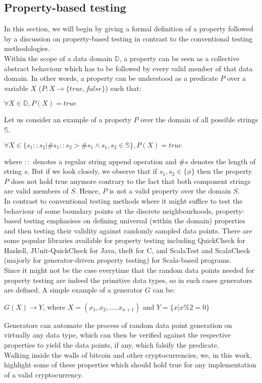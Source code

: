 
\newcommand{\avector}[2]{(#1_1,#1_2,\ldots,#1_{#2})}
\newcommand{\aDEFvector}[2][a]{(#1_1,#1_2,\ldots,#1_{#2})}

\subsection{Property-based testing}
In this section, we will begin by giving a formal definition of a property followed by a discussion on property-based testing in contrast to the conventional testing methodologies.\\
Within the scope of a data domain $\mathbb{D}$, a property can be seen as a collective abstract behaviour which has to be followed by every valid member of that data domain. In other words, a property can be understood as a predicate $P$ over a variable $X$ ($P:X \rightarrow \{true, false\}$) such that: 
\begin{center}
$\forall X \in \mathbb{D}, P(X) = true$
\end{center}
Let us consider an example of a property $P$ over the domain of all possible strings $\mathbb{S}$.
\begin{center}
$\forall X \in \{s_1::s_2 | \#s_1::s_2 >  \#s_1 \wedge s_1, s_2 \in \mathbb{S}\}, P(X) = true$
\end{center}
where $::$ denotes a regular string append operation and $\#s$ denotes the length of string $s$. But if we look closely, we observe that if $s_1, s_2 \in \{\phi\}$ then the property $P$ does not hold true anymore contrary to the fact that both component strings are valid members of $S$. Hence, $P$ is not a valid property over the domain $S$. \\
In contrast to conventional testing methods where it might suffice to test the behaviour of some boundary points at the discrete neighbourhoods, property-based testing emphasises on defining universal (within the domain) properties and then testing their validity against randomly sampled data points. There are some popular libraries available for property testing including QuickCheck for Haskell, JUnit-QuickCheck for Java, theft for C, and ScalaTest and ScalaCheck (majorly for generator-driven property testing) for Scala-based programs. \\
Since it might not be the case everytime that the random data points needed for property testing are indeed the primitive data types, so in such cases generators are defined. A simple example of a generator $G$ can be:
\begin{center}
$G(X) \rightarrow {Y}$, where $X=\aDEFvector[x]{n+1}$ and $Y=\{x | x \% 2 = 0\}$
\end{center}
Generators can automate the process of random data point generation on virtually any data type, which can then be verified against the respective properties to yield the data points, if any, which falsify the predicate.\\

Walking inside the walls of bitcoin and other cryptocurrencies, we, in this work, highlight some of these properties which should hold true for any implementation of a valid cryptocurrency.